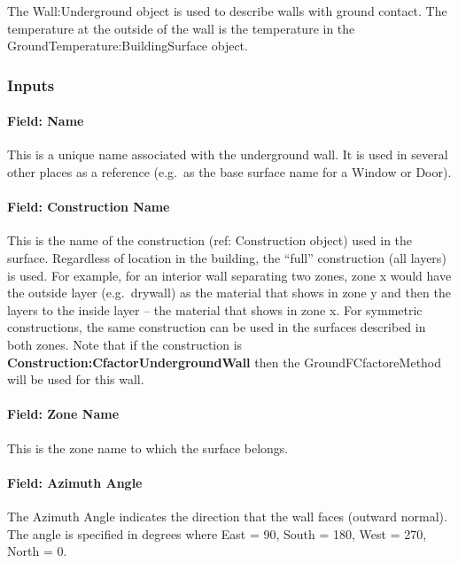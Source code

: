 The Wall:Underground object is used to describe walls with ground contact. The temperature at the outside of the wall is the temperature in the GroundTemperature:BuildingSurface object.

\subsubsection{Inputs}\label{inputs-6-029}

\paragraph{Field: Name}\label{field-name-2-039}

This is a unique name associated with the underground wall. It is used in several other places as a reference (e.g.~as the base surface name for a Window or Door).

\paragraph{Field: Construction Name}\label{field-construction-name-2-001}

This is the name of the construction (ref: Construction object) used in the surface. Regardless of location in the building, the ``full'' construction (all layers) is used. For example, for an interior wall separating two zones, zone x would have the outside layer (e.g.~drywall) as the material that shows in zone y and then the layers to the inside layer -- the material that shows in zone x. For symmetric constructions, the same construction can be used in the surfaces described in both zones. Note that if the construction is \textbf{Construction:CfactorUndergroundWall} then the GroundFCfactoreMethod will be used for this wall.

\paragraph{Field: Zone Name}\label{field-zone-name-2-007}

This is the zone name to which the surface belongs.

\paragraph{Field: Azimuth Angle}\label{field-azimuth-angle-2}

The Azimuth Angle indicates the direction that the wall faces (outward normal). The angle is specified in degrees where East = 90, South = 180, West = 270, North = 0.

